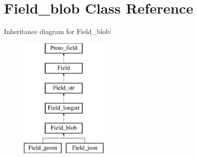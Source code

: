 \hypertarget{classField__blob}{}\section{Field\+\_\+blob Class Reference}
\label{classField__blob}
Inheritance diagram for Field\+\_\+blob\+:\begin{figure}[H]
\begin{center}
\leavevmode
\includegraphics[height=6.000000cm]{classField__blob}
\end{center}
\end{figure}
